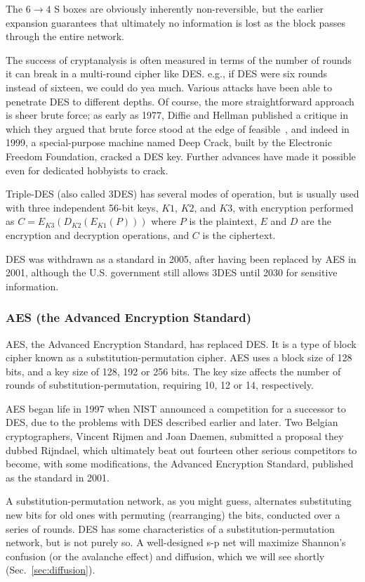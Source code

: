 \documentclass[%
 aip,
 jmp,%
 amsmath,amssymb,
 reprint,%
]{revtex4-1}
\begin{document}
The $6 \rightarrow 4$ S boxes are obviously inherently non-reversible,
but the earlier expansion guarantees that ultimately no information is
lost as the block passes through the entire network.

The success of cryptanalysis is often measured in terms of the number
of rounds it can break in a multi-round cipher like DES.  e.g., if DES
were six rounds instead of sixteen, we could do yea much.  Various
attacks have been able to penetrate DES to different depths.  Of
course, the more straightforward approach is sheer brute force; as
early as 1977, Diffie and Hellman published a critique in which they
argued that brute force stood at the edge of
feasible~\cite{diffie1977special}, and indeed in 1999, a
special-purpose machine named Deep Crack, built by the Electronic
Freedom Foundation, cracked a DES key.  Further advances have made it
possible even for dedicated hobbyists to crack.

Triple-DES (also called 3DES) has several modes of operation, but is
usually used with three independent 56-bit keys, $K1$, $K2$, and $K3$,
with encryption performed as $C = E_{K3}(D_{K2}(E_{K1}(P)))$ where $P$
is the plaintext, $E$ and $D$ are the encryption and decryption
operations, and $C$ is the ciphertext.

DES was withdrawn as a standard in 2005, after having been replaced by
AES in 2001, although the U.S. government still allows 3DES until 2030
for sensitive information.

\subsubsection{AES (the Advanced Encryption Standard)}

AES, the Advanced Encryption Standard, has replaced DES.  It is a type of block cipher known as a substitution-permutation cipher.  AES uses a block size of 128 bits, and a key size of 128, 192 or 256 bits. The key size affects the number of rounds of substitution-permutation, requiring 10, 12 or 14, respectively.

AES began life in 1997 when NIST announced a competition for a successor to DES, due to the problems with DES described earlier and later. Two Belgian cryptographers, Vincent Rijmen and Joan Daemen, submitted a proposal they dubbed Rijndael, which ultimately beat out fourteen other serious competitors to become, with some modifications, the Advanced Encryption Standard, published as the standard in 2001.

A substitution-permutation network, as you might guess, alternates
substituting new bits for old ones with permuting (rearranging) the
bits, conducted over a series of rounds. DES has some characteristics
of a substitution-permutation network, but is not purely so. A
well-designed s-p net will maximize Shannon's confusion (or the
avalanche effect) and diffusion, which we will see shortly (Sec.~\ref{sec:diffusion}).
\end{document}

